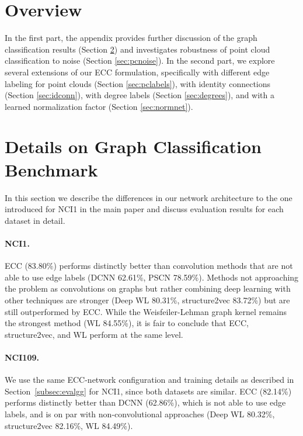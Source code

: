 \documentclass[10pt,twocolumn,letterpaper]{article}
\begin{document}
\section{Overview}

In the first part, the appendix provides further discussion of the graph classification results (Section \ref{sec:gcdetails}) and investigates robustness of point cloud classification to noise (Section \ref{sec:pcnoise}). In the second part, we explore several extensions of our ECC formulation, specifically with different edge labeling for point clouds (Section \ref{sec:pclabels}), with identity connections (Section \ref{sec:idconn}), with degree labels (Section \ref{sec:degrees}), and with a learned normalization factor  (Section \ref{sec:normnet}).


\section{Details on Graph Classification Benchmark} \label{sec:gcdetails}

In this section we describe the differences in our network architecture to the one introduced for NCI1 in the main paper and discuss evaluation results for each dataset in detail.

\paragraph*{NCI1.} ECC (83.80\%) performs distinctly better than convolution methods that are not able to use edge labels (DCNN \cite{dcnn} 62.61\%, PSCN \cite{niepert} 78.59\%). Methods not approaching the problem as convolutions on graphs but rather combining deep learning with other techniques are stronger (Deep WL \cite{deepkern} 80.31\%, structure2vec \cite{struct2vec} 83.72\%) but are still outperformed by ECC. While the Weisfeiler-Lehman graph kernel remains the strongest method (WL \cite{shervashidze} 84.55\%), it is fair to conclude that ECC, structure2vec, and WL perform at the same level.

\paragraph*{NCI109.} We use the same ECC-network configuration and training details as described in Section~\ref{subsec:evalgg} for NCI1, since both datasets are similar. ECC (82.14\%) performs distinctly better than DCNN \cite{dcnn} (62.86\%), which is not able to use edge labels, and is on par with non-convolutional approaches (Deep WL \cite{deepkern} 80.32\%, structure2vec \cite{struct2vec} 82.16\%, WL \cite{shervashidze} 84.49\%).
\end{document}
